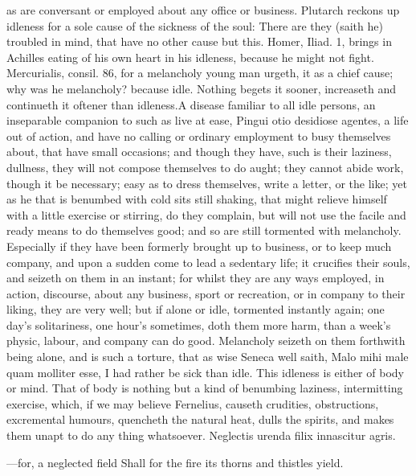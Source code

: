 {as are conversant or employed about any office or business.
Plutarch reckons up idleness for a sole cause of the sickness of
the soul: There are they (saith he) troubled in mind, that have no
other cause but this. Homer, Iliad. 1, brings in Achilles eating of his
own heart in his idleness, because he might not fight. Mercurialis,
consil. 86, for a melancholy young man urgeth, it as a chief
cause; why was he melancholy? because idle. Nothing begets it sooner,
increaseth and continueth it oftener than idleness.A disease
familiar to all idle persons, an inseparable companion to such as live
at ease, Pingui otio desidiose agentes, a life out of action, and have
no calling or ordinary employment to busy themselves about, that have
small occasions; and though they have, such is their laziness,
dullness, they will not compose themselves to do aught; they cannot
abide work, though it be necessary; easy as to dress themselves, write
a letter, or the like; yet as he that is benumbed with cold sits still
shaking, that might relieve himself with a little exercise or stirring,
do they complain, but will not use the facile and ready means to do
themselves good; and so are still tormented with melancholy. Especially
if they have been formerly brought up to business, or to keep much
company, and upon a sudden come to lead a sedentary life; it crucifies
their souls, and seizeth on them in an instant; for whilst they are any
ways employed, in action, discourse, about any business, sport or
recreation, or in company to their liking, they are very well; but if
alone or idle, tormented instantly again; one day's solitariness, one
hour's sometimes, doth them more harm, than a week's physic, labour,
and company can do good. Melancholy seizeth on them forthwith being
alone, and is such a torture, that as wise Seneca well saith, Malo mihi
male quam molliter esse, I had rather be sick than idle. This idleness
is either of body or mind. That of body is nothing but a kind of
benumbing laziness, intermitting exercise, which, if we may believe
Fernelius, causeth crudities, obstructions, excremental humours,
quencheth the natural heat, dulls the spirits, and makes them unapt to
do any thing whatsoever.
Neglectis urenda filix innascitur agris.

---for, a neglected field
Shall for the fire its thorns and thistles yield.

}

